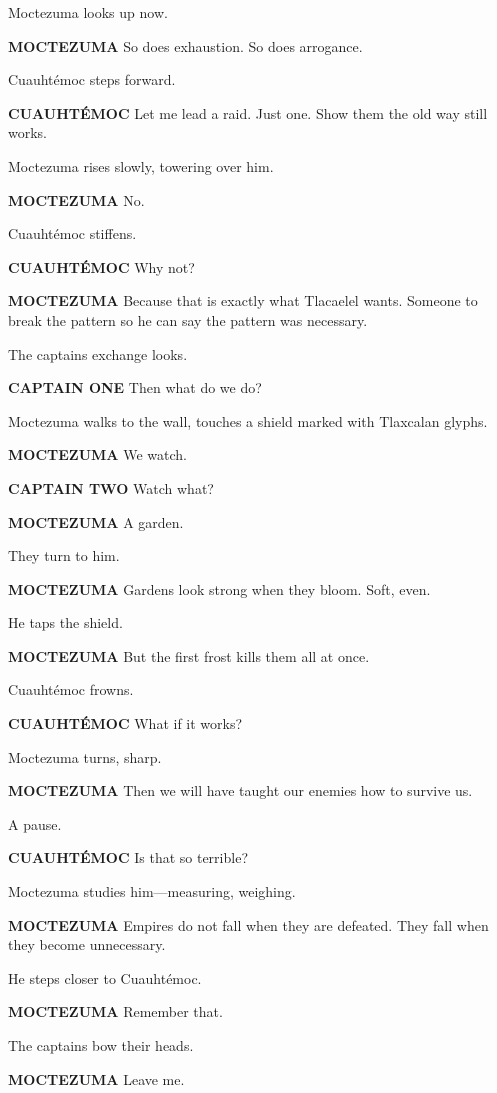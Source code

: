 \documentclass[12pt]{article}
\begin{document}
Moctezuma looks up now.

\textbf{MOCTEZUMA}  
So does exhaustion.  
So does arrogance.

Cuauhtémoc steps forward.

\textbf{CUAUHTÉMOC}  
Let me lead a raid.  
Just one.  
Show them the old way still works.

Moctezuma rises slowly, towering over him.

\textbf{MOCTEZUMA}  
No.

Cuauhtémoc stiffens.

\textbf{CUAUHTÉMOC}  
Why not?

\textbf{MOCTEZUMA}  
Because that is exactly what Tlacaelel wants.  
Someone to break the pattern  
so he can say the pattern was necessary.

The captains exchange looks.

\textbf{CAPTAIN ONE}  
Then what do we do?

Moctezuma walks to the wall, touches a shield marked with Tlaxcalan glyphs.

\textbf{MOCTEZUMA}  
We watch.

\textbf{CAPTAIN TWO}  
Watch what?

\textbf{MOCTEZUMA}  
A garden.

They turn to him.

\textbf{MOCTEZUMA}  
Gardens look strong when they bloom.  
Soft, even.

He taps the shield.

\textbf{MOCTEZUMA}  
But the first frost kills them all at once.

Cuauhtémoc frowns.

\textbf{CUAUHTÉMOC}  
What if it works?

Moctezuma turns, sharp.

\textbf{MOCTEZUMA}  
Then we will have taught our enemies  
how to survive us.

A pause.

\textbf{CUAUHTÉMOC}  
Is that so terrible?

Moctezuma studies him—measuring, weighing.

\textbf{MOCTEZUMA}  
Empires do not fall when they are defeated.  
They fall when they become unnecessary.

He steps closer to Cuauhtémoc.

\textbf{MOCTEZUMA}  
Remember that.

The captains bow their heads.

\textbf{MOCTEZUMA}  
Leave me.
\end{document}
